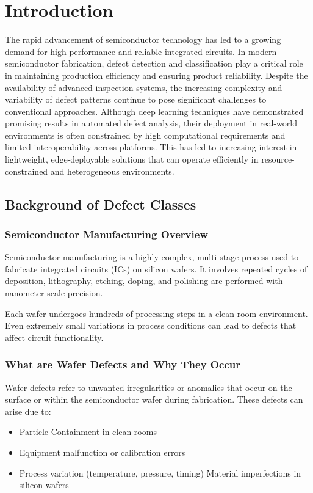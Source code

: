 \chapter{Introduction}

The rapid advancement of semiconductor technology has led to a growing demand for high-performance and reliable integrated circuits. In modern semiconductor fabrication, defect detection and classification play a critical role in maintaining production efficiency and ensuring product reliability. Despite the availability of advanced inspection systems, the increasing complexity and variability of defect patterns continue to pose significant challenges to conventional approaches. Although deep learning techniques have demonstrated promising results in automated defect analysis, their deployment in real-world environments is often constrained by high computational requirements and limited interoperability across platforms. This has led to increasing interest in lightweight, edge-deployable solutions that can operate efficiently in resource-constrained and heterogeneous environments. 


\section{Background of Defect Classes}
\subsection{Semiconductor Manufacturing Overview}
Semiconductor manufacturing is a highly complex, multi-stage process used to fabricate integrated circuits (ICs) on silicon wafers. It involves repeated cycles of deposition, lithography, etching, doping, and polishing are performed with nanometer-scale precision.

Each wafer undergoes hundreds of processing steps in a clean room environment. Even extremely small variations in process conditions can lead to defects that affect circuit functionality.

\subsection{What are Wafer Defects and Why They Occur}
Wafer defects refer to unwanted irregularities or anomalies that occur on the surface or within the semiconductor wafer during fabrication. These defects can arise due to:
\begin{itemize}
\item Particle Containment in clean rooms
\item Equipment malfunction or calibration errors
\item Process variation (temperature, pressure, timing)
Material imperfections in silicon wafers
\end{itemize}

